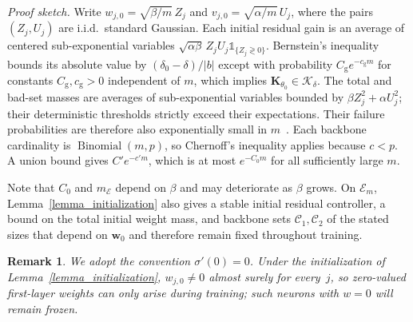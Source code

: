 \documentclass[letterpaper, 10 pt, conference]{ieeeconf}
\newcommand{\bw}{\mathbf{w}}
\newcommand{\bK}{\mathbf{K}}
\newcommand{\cC}{\mathcal{C}}
\newcommand{\cE}{\mathcal{E}}
\newcommand{\cK}{\mathcal{K}}
\newcommand{\ind}[1]{\mathds{1}_{#1}}
\newtheorem{remark}{Remark}
\DeclareMathOperator*{\binomial}{Binomial}
\newcommand{\Lemm}{Lemma}
\begin{document}
\emph{Proof sketch.} Write
$w_{j,0}=\sqrt{\beta/m}\,Z_j$ and
$v_{j,0}=\sqrt{\alpha/m}\,U_j$, where the pairs $(Z_j,U_j)$ are i.i.d.\ standard Gaussian.
Each initial residual gain is an average of centered sub-exponential
variables $\sqrt{\alpha\beta}\,Z_jU_j\ind{\{Z_j\gtrless0\}}$.
Bernstein's inequality bounds its absolute value by
$(\delta_0-\delta)/|b|$ except with probability $C_{\mathrm g}e^{-c_{\mathrm g}m}$ for constants $C_{\mathrm g},c_{\mathrm g}>0$ independent of $m$,
which implies $\bK_{\theta_0}\in\cK_\delta$.
The total and bad-set masses are averages of sub-exponential variables
bounded by $\beta Z_j^2+\alpha U_j^2$; their deterministic thresholds
strictly exceed their expectations. Their failure probabilities are
therefore also exponentially small in $m$~\cite{vershynin2018high}.
Each backbone cardinality is $\binomial(m,p)$, so Chernoff's inequality
applies because $c<p$. A union bound gives $C'e^{-c'm}$, which is at most
$e^{-C_0m}$ for all sufficiently large $m$.

Note that $C_0$ and $m_{\cE}$ depend on $\beta$ and may deteriorate as $\beta$ grows. On $\cE_m$, \Lemm~\ref{lemma_initialization} also gives a stable initial residual controller, a bound on the total initial weight mass, and backbone sets $\cC_1,\cC_2$ of the stated sizes that depend on $\bw_0$ and therefore remain fixed throughout training.
 
\begin{remark} \label{remark_relu_subgradient}
    We adopt the convention $\sigma'(0)=0$. Under the initialization of \Lemm~\ref{lemma_initialization}, $w_{j,0} \neq 0$ almost surely for every~$j$, so zero-valued first-layer weights can only arise during training; such neurons with $w=0$ will remain frozen.
\end{remark}
 
\end{document}
